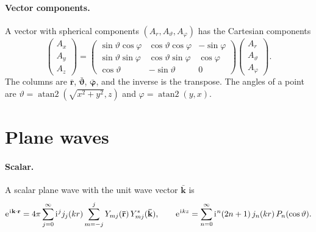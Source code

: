 \documentclass[
    pra,
    aps,
    reprint,
    onecolumn,
    amsmath,amssymb,
    a4paper,
    superscriptaddress,
    10pt,
    nofootinbib
]{revtex4-2}
\newcommand{\iu}{\mathrm{i}\mkern1mu}                 %
\newcommand{\eu}{\mathrm{e}\mkern1mu}                 %
\newcommand{\ort}[1]{\boldsymbol{\mathbf{\bar{#1}}}}  %
\begin{document}
\paragraph{Vector components.}
A vector with spherical components $(A_r, A_\vartheta, A_\varphi)$ has the Cartesian components
\begin{equation}
    \begin{pmatrix} A_x \\ A_y \\ A_z \end{pmatrix} =
    \begin{pmatrix}
        \sin\vartheta\cos\varphi & \cos\vartheta\cos\varphi & -\sin\varphi \\
        \sin\vartheta\sin\varphi & \cos\vartheta\sin\varphi & \cos\varphi \\
        \cos\vartheta & -\sin\vartheta & 0
    \end{pmatrix}
    \begin{pmatrix} A_r \\ A_\vartheta \\ A_\varphi \end{pmatrix}.
    \label{eq:rotation}
\end{equation}
The columns are $\ort{r}$, $\ort{\vartheta}$, $\ort{\varphi}$, and the inverse is the transpose.
The angles of a point are $\vartheta = \operatorname{atan2}(\sqrt{x^2+y^2}, z)$ and $\varphi = \operatorname{atan2}(y, x)$.

\section{Plane waves}
\label{sec:planewaves}

\paragraph{Scalar.}
A scalar plane wave with the unit wave vector $\ort{k}$ is
\begin{equation}
    \eu^{\iu\vb{k}\cdot\vb{r}} = 4\pi\sum_{j=0}^\infty \iu^j j_j(kr) \sum_{m=-j}^{j} Y_{mj}(\ort{r})\, Y^*_{mj}(\ort{k}), \qquad
    \eu^{\iu kz} = \sum_{n=0}^\infty \iu^n (2n+1)\, j_n(kr)\, P_n(\cos\vartheta).
    \label{eq:pw_scalar}
\end{equation}
\end{document}
